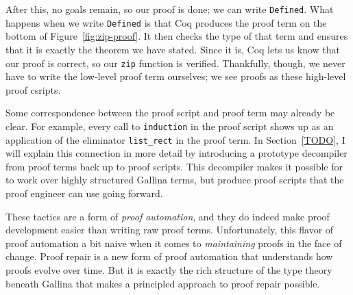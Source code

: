 After this, no goals remain, so our proof is done; we can write \lstinline{Defined}.
What happens when we write \lstinline{Defined} is that Coq produces the proof term on the bottom of Figure~\ref{fig:zip-proof}. %
It then checks the type of that term and ensures that it is exactly the theorem we have stated.
Since it is, Coq lets us know that our proof is correct, so our \lstinline{zip} function is verified.
Thankfully, though, we never have to write the low-level proof term ourselves; we see proofs as these high-level proof csripts.

Some correspondence between the proof script and proof term may already be clear.
For example, every call to \lstinline{induction} in the proof script shows up as an application of the eliminator \lstinline{list_rect}
in the proof term.
In Section~\ref{TODO}, I will explain this connection in more detail by introducing a prototype decompiler from proof terms back up to proof scripts.
This decompiler makes it possible for \sysname to work over highly structured Gallina terms,
but produce proof scripts that the proof engineer can use going forward.

These tactics are a form of \textit{proof automation}, and they do indeed make proof development easier than writing raw proof terms.
Unfortunately, this flavor of proof automation a bit naive when it comes to \textit{maintaining} proofs in the face of change.
Proof repair is a new form of proof automation that understands how proofs evolve over time.
But it is exactly the rich structure of the type theory beneath Gallina that makes a principled approach to proof repair possible.



